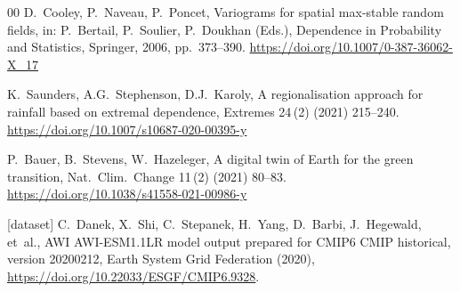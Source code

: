 \documentclass[preprint,12pt,a4paper]{elsarticle}
\begin{document}
\begin{thebibliography}{00}
D.~Cooley, P.~Naveau, P.~Poncet,
Variograms for spatial max-stable random fields,
in: P.~Bertail, P.~Soulier, P.~Doukhan (Eds.),
Dependence in Probability and Statistics,
Springer, 2006, pp.~373--390.
\url{https://doi.org/10.1007/0-387-36062-X_17}

K.~Saunders, A.G.~Stephenson, D.J.~Karoly,
A regionalisation approach for rainfall based on extremal dependence,
Extremes 24\,(2) (2021) 215--240.
\url{https://doi.org/10.1007/s10687-020-00395-y}

P.~Bauer, B.~Stevens, W.~Hazeleger,
A digital twin of Earth for the green transition,
Nat.\ Clim.\ Change 11\,(2) (2021) 80--83.
\url{https://doi.org/10.1038/s41558-021-00986-y}

[dataset] C.~Danek, X.~Shi, C.~Stepanek, H.~Yang, D.~Barbi,
J.~Hegewald, et~al.,
AWI AWI-ESM1.1LR model output prepared for CMIP6 CMIP historical,
version 20200212, Earth System Grid Federation (2020),
\url{https://doi.org/10.22033/ESGF/CMIP6.9328}.

\end{thebibliography}
\end{document}
